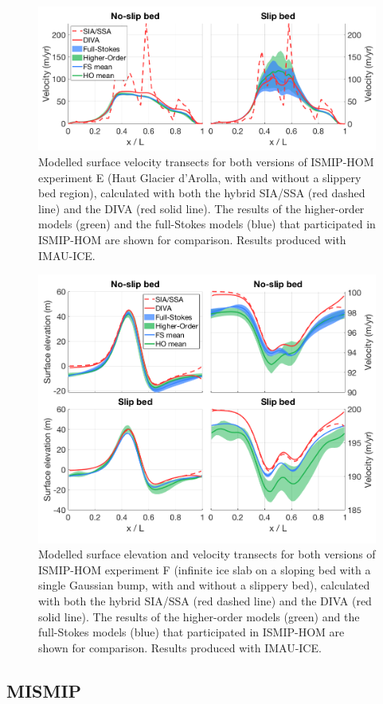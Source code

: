 \documentclass{article}
\begin{document}
\begin{figure}[H]
  \includegraphics[width=0.7\linewidth]{Fig_benchmark_ISMIP_HOM_E.png}
  \caption{Modelled surface velocity transects for both versions of ISMIP-HOM experiment E (Haut Glacier d’Arolla, with and without a slippery bed region), calculated with both the hybrid SIA/SSA (red dashed line) and the DIVA (red solid line). The results of the higher-order models (green) and the full-Stokes models (blue) that participated in ISMIP-HOM are shown for comparison. Results produced with IMAU-ICE.}
\end{figure}

\begin{figure}[H]
  \includegraphics[width=0.7\linewidth]{Fig_benchmark_ISMIP_HOM_F.png}
  \caption{Modelled surface elevation and velocity transects for both versions of ISMIP-HOM experiment F (infinite ice slab on a sloping bed with a single Gaussian bump, with and without a slippery bed), calculated with both the hybrid SIA/SSA (red dashed line) and the DIVA (red solid line). The results of the higher-order models (green) and the full-Stokes models (blue) that participated in ISMIP-HOM are shown for comparison. Results produced with IMAU-ICE.}
\end{figure}

\subsection{MISMIP}
\end{document}
